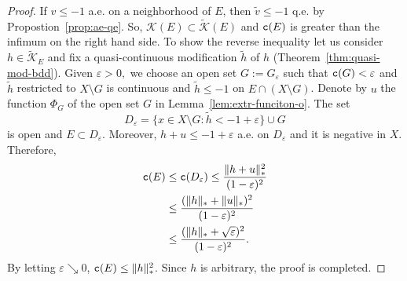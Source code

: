 \documentclass{amsart}
\newcommand{\wt}[1]{\widetilde{#1}}
\newcommand{\veps}{\varepsilon}
\newcommand{\tc}{{\tt c}}
\newcommand{\cali}[1]{\mathscr{#1}}
\newcommand{\Kc}{\cali{K}}
\theoremstyle{definition}
\numberwithin{thm}{section}
\numberwithin{equation}{section}
\renewcommand{\[}{\begin{equation}}
\renewcommand{\]}{\end{equation}}
\begin{document}
\begin{proof} If $v\leq -1$ a.e. on a neighborhood of $E$, then $\wt v \leq -1$ q.e. by Propostion~\ref{prop:ae-qe}. So,  $\Kc(E) \subset \wt\Kc(E)$ and  $\tc (E)$ is greater than the infimum on the right hand side.
To show the reverse inequality let us consider $h\in \wt\Kc_E$ and fix a quasi-continuous modification $\wt h$ of $h$ (Theorem~\ref{thm:quasi-mod-bdd}). Given $\veps>0,$ we choose an open set $G:= G_\veps$ such that $\tc (G)<\veps$ and $\wt h$ restricted to $X\setminus G$ is continuous and $\wt h \leq -1$ on $E \cap (X\setminus G)$. Denote  by $u$ the function $\Phi_{G}$ of  the open set $G$ in Lemma~\ref{lem:extr-funciton-o}. The set
$$
	D_\veps = \{x\in X \setminus G: \wt h < -1+\veps \} \cup G
$$
is open and $E\subset D_\veps$. Moreover, $h + u \leq -1 + \veps$ a.e. on $D_\veps$ and it is negative in $X$.
Therefore,
$$\begin{aligned}
	\tc (E) &\leq \tc (D_\veps) \leq \frac{\|h+u\|_*^2}{(1-\veps)^2}  \\& \leq \frac{ (\|h\|_* +\|u\|_*)^2}{(1-\veps)^2} \\ &\leq \frac{ (\|h\|_* + \sqrt{\veps})^2}{(1-\veps)^2}.
\end{aligned}$$
By letting $\veps \searrow 0$, $\tc(E) \leq \|h\|_*^2$. Since $h$ is arbitrary, the proof is completed.
\end{proof}
\end{document}
